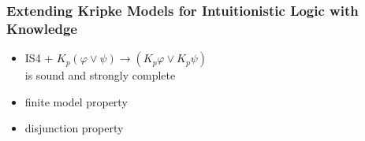 \documentclass[slidestop,compress,mathserif]{beamer}
\renewcommand{\phi}{\varphi}
\begin{document}
\begin{frame}
\vfill
 \end{frame}

 \begin{frame}
  \frametitle{Extending Kripke Models for Intuitionistic Logic with
   Knowledge}
 \begin{itemize}
  \item    IS4 + $K_p(\phi\lor\psi) \rightarrow (K_p\phi \lor K_p\psi)$\\
	   is sound and strongly complete
  \item finite model property
  \item disjunction property
 \end{itemize}
 \end{frame}
\end{document}
